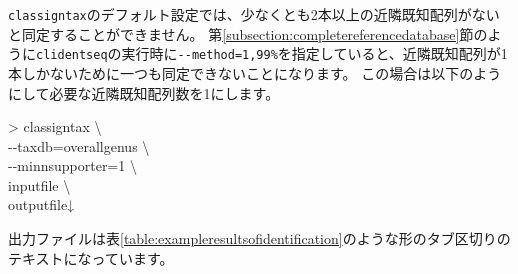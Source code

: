 \documentclass[titlepage,10pt,a4paper,english]{jsbook}
\newenvironment{cmd}{\begin{oframed}\raggedright\ttfamily\footnotesize\setlength{\baselineskip}{1.4em}}{\end{oframed}\vspace{-1em}}
\begin{document}
\texttt{classigntax}のデフォルト設定では、少なくとも2本以上の近隣既知配列がないと同定することができません。
第\ref{subsection:completereferencedatabase}節のように\texttt{clidentseq}の実行時に\texttt{{-}{-}method=1,99\%}を指定していると、近隣既知配列が1本しかないために一つも同定できないことになります。
この場合は以下のようにして必要な近隣既知配列数を1にします。
\begin{cmd}
{\textgreater} classigntax {\textbackslash}\\
{-}{-}taxdb=overall{\textunderscore}genus {\textbackslash}\\
{-}{-}minnsupporter=1 {\textbackslash}\\
inputfile {\textbackslash}\\
outputfile↓
\end{cmd}
出力ファイルは表\ref{table:exampleresultsofidentification}のような形のタブ区切りのテキストになっています。
\end{document}
